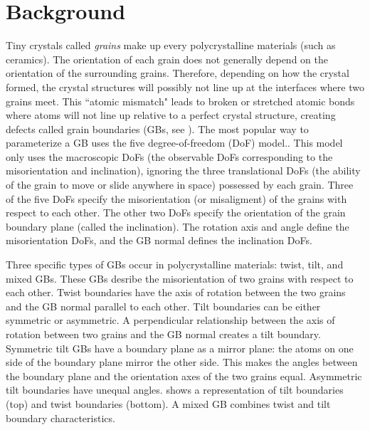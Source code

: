 \documentclass[12pt]{report}
\begin{document}
\chapter{Background\label{background}}
Tiny crystals called \emph{grains} make up every polycrystalline materials (such as ceramics).  The orientation of each grain does not generally depend on the orientation of the surrounding grains. Therefore, depending on how the crystal formed,\cite{callister2003} the crystal structures will possibly not line up at the interfaces where two grains meet.  This ``atomic mismatch"\cite{callister2003} leads to broken or stretched atomic bonds where atoms will not line up relative to a perfect crystal structure, creating defects called grain boundaries (GBs, see ). The most popular way to parameterize a GB uses the five degree-of-freedom (DoF) model.\cite{patala2013, lejcek2010, homer2015, bulatov2014, harbison2015, rohrer2011}.  This model only uses the macroscopic DoFs (the observable DoFs corresponding to the misorientation and inclination), ignoring the three translational DoFs (the ability of the grain to move or slide anywhere in space) possessed by each grain.  Three of the five DoFs specify the misorientation (or misaligment) of the grains with respect to each other.  The other two DoFs specify the orientation of the grain boundary plane (called the inclination).  The rotation axis and angle define the misorientation DoFs, and the GB normal defines the inclination DoFs.\cite{lejcek2010}

Three specific types of GBs occur in polycrystalline materials: twist, tilt, and mixed GBs.\cite{lejcek2010, rohrer2011}  These GBs desribe the misorientation of two grains with respect to each other.  Twist boundaries have the axis of rotation between the two grains and the GB normal parallel to each other. Tilt boundaries can be either symmetric or asymmetric.  A perpendicular relationship between the axis of rotation between two grains and the GB normal creates a tilt boundary.  Symmetric tilt GBs have a boundary plane as a mirror plane: the atoms on one side of the boundary plane mirror the other side.  This makes the angles between the boundary plane and the orientation axes of the two grains equal. Asymmetric tilt boundaries have unequal angles.   shows a representation of tilt boundaries (top) and twist boundaries (bottom).  A mixed GB combines twist and tilt boundary characteristics.
\end{document}
